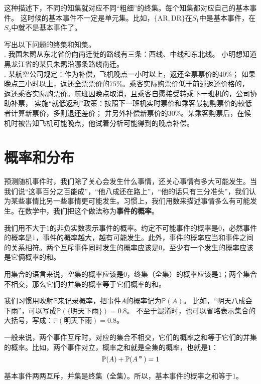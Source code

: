 \documentclass[12pt,UTF8]{ctexbook}
\begin{document}
这种描述下，不同的知集就对应不同“粗细”的终集。每个知集都对应自己的基本事件。
这时候的基本事件不一定是单元集。比如，$\{\mbox{AR}, \mbox{DR}\}$在$S_1$中是基本事件，在$S_2$中就不是基本事件了。

\begin{xt}
    写出以下问题的终集和知集。\\
    . 我国朱鹮从东北省份向南迁徙的路线有三条：西线、中线和东北线。
    小明想知道黑龙江省的某只朱鹮沿哪条路线南迁。\\
    . 某航空公司规定：作为补偿，飞机晚点一小时以上，返还全票票价的$40\%$；
    如果晚点三小时以上，返还全票票价的$75\%$。乘客实际购票价低于前述返还价格的，
    返还乘客实际购票价。航班因晚点取消，且乘客自愿接受转乘下一班机的，公司协助补票，
    实施“就低返利”政策：按照下一班机实时票价和乘客最初购票价的较低者计算新票价，多则退还差价；
    并另外补偿新票价的$30\%$。某乘客购票后，在候机时被告知飞机可能晚点，他试着分析可能得到的晚点补偿。
\end{xt}

\section{概率和分布}

预测随机事件时，我们除了关心会发生什么事情，还关心事情有多大可能发生。当我们说“这事百分之百能成”，“他八成还在路上”，“他的话只有三分准头”，我们认为某些事情比另一些事情更可能发生。习惯上，我们用数来描述事情多么有可能发生。在数学中，我们把这个做法称为\textbf{事件的概率}。

我们用不大于$1$的非负实数表示事件的概率。约定不可能事件的概率是$0$，必然事件的概率是$1$，事件的概率越大，越有可能发生。此外，事件的概率应当和事件之间的关系相符。两个互斥事件同时发生的概率应该是$0$，至少有一个发生的概率应该是它俩概率的和。

用集合的语言来说，空集的概率应该是$0$，终集（全集）的概率应该是$1$；两个集合不相交，那么它们的并集的概率等于它们概率的和。

我们习惯用映射$\mathbb{P}$来记录概率，把事件$A$的概率记为$\mathbb{P}(A)$。
比如，“明天八成会下雨”，可以写成$\mathbb{P}(\{\mbox{明天下雨}\}) = 0.8$。
不至于混淆时，也可以省略表示集合的大括号，写成：$\mathbb{P}(\mbox{明天下雨}) = 0.8$。

一般来说，两个事件互斥时，对应的集合不相交，它们的概率之和等于它们的并集的概率。比如，两个事件对立，概率之和就是全集的概率，也就是$1$：
$$ \mathbb{P}(A) + \mathbb{P}(A^{\bu}) = 1 $$

基本事件两两互斥，并集是终集（全集）。所以，基本事件的概率之和等于$1$。
\end{document}
